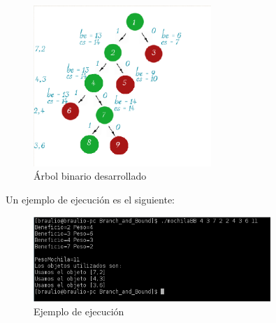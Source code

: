 \documentclass[10pt,a4paper,spanish]{report}
\begin{document}
\begin{center}
\begin{figure}[!h]
\centering
\includegraphics[width=0.6\textwidth]{figura5}
\caption{Árbol binario desarrollado}
\label{figura5}
\end{figure}
\end{center}


Un ejemplo de ejecución es el siguiente:

\begin{center}
\begin{figure}[!h]
\centering
\includegraphics[width=0.8\textwidth]{figura6}
\caption{Ejemplo de ejecución}
\label{figura6}
\end{figure}
\end{center}
\end{document}
